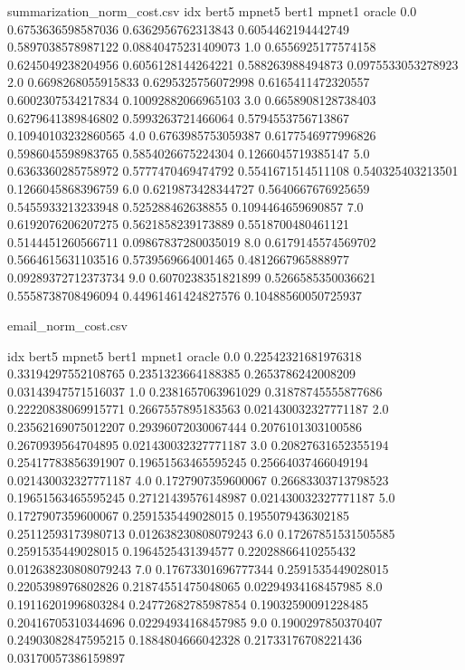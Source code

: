 \begin{filecontents*}{summarization_norm_cost.csv}
idx	bert5	mpnet5	bert1	mpnet1	oracle
0.0	0.6753636598587036	0.6362956762313843	0.6054462194442749	0.5897038578987122	0.08840475231409073
1.0	0.6556925177574158	0.6245049238204956	0.6056128144264221	0.588263988494873	0.0975533053278923
2.0	0.6698268055915833	0.6295325756072998	0.6165411472320557	0.6002307534217834	0.10092882066965103
3.0	0.6658908128738403	0.6279641389846802	0.5993263721466064	0.5794553756713867	0.10940103232860565
4.0	0.6763985753059387	0.6177546977996826	0.5986045598983765	0.5854026675224304	0.1266045719385147
5.0	0.6363360285758972	0.5777470469474792	0.5541671514511108	0.540325403213501	0.1266045868396759
6.0	0.6219873428344727	0.5640667676925659	0.5455933213233948	0.525288462638855	0.1094464659690857
7.0	0.6192076206207275	0.5621858239173889	0.5518700480461121	0.5144451260566711	0.09867837280035019
8.0	0.6179145574569702	0.5664615631103516	0.5739569664001465	0.4812667965888977	0.09289372712373734
9.0	0.6070238351821899	0.5266585350036621	0.5558738708496094	0.44961461424827576	0.10488560050725937
\end{filecontents*}

\begin{filecontents*}{email_norm_cost.csv}

idx	bert5	mpnet5	bert1	mpnet1	oracle
0.0	0.22542321681976318	0.33194297552108765	0.2351323664188385	0.2653786242008209	0.03143947571516037
1.0	0.2381657063961029	0.31878745555877686	0.22220838069915771	0.2667557895183563	0.021430032327771187
2.0	0.23562169075012207	0.29396072030067444	0.2076101303100586	0.2670939564704895	0.021430032327771187
3.0	0.20827631652355194	0.25417783856391907	0.19651563465595245	0.25664037466049194	0.021430032327771187
4.0	0.1727907359600067	0.26683303713798523	0.19651563465595245	0.27121439576148987	0.021430032327771187
5.0	0.1727907359600067	0.2591535449028015	0.1955079436302185	0.25112593173980713	0.012638230808079243
6.0	0.17267851531505585	0.2591535449028015	0.1964525431394577	0.22028866410255432	0.012638230808079243
7.0	0.17673301696777344	0.2591535449028015	0.2205398976802826	0.21874551475048065	0.02294934168457985
8.0	0.19116201996803284	0.24772682785987854	0.19032590091228485	0.20416705310344696	0.02294934168457985
9.0	0.1900297850370407	0.24903082847595215	0.1884804666042328	0.21733176708221436	0.03170057386159897


\end{filecontents*}

